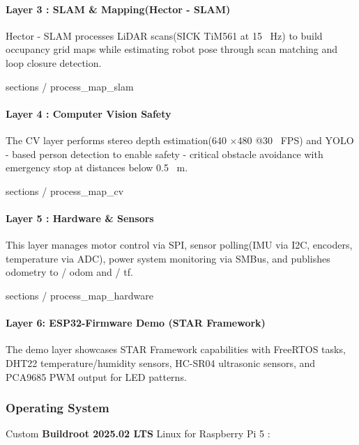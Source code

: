 \paragraph{Layer 3 : SLAM \& Mapping(Hector - SLAM)}

    Hector -
    SLAM processes LiDAR
    scans(SICK TiM561 at 15 ~Hz) to build occupancy grid maps while estimating
    robot pose through scan matching and loop closure detection.

 {
  sections / process_map_slam
}

\paragraph{Layer 4 : Computer Vision Safety}

    The CV layer performs stereo depth
    estimation(640 $\times$480 @30 ~FPS) and
    YOLO - based person detection to enable safety -
        critical obstacle avoidance with emergency stop at distances below
        0.5 ~m.

 {
  sections / process_map_cv
}

\paragraph{Layer 5 : Hardware \& Sensors}

This layer manages motor control via SPI,
    sensor polling(IMU via I2C, encoders, temperature via ADC),
    power system monitoring via SMBus,
    and publishes odometry to / odom and /
        tf.

 {
  sections / process_map_hardware
}

\paragraph{Layer 6: ESP32-Firmware Demo (STAR Framework)}

The demo layer showcases STAR Framework capabilities with FreeRTOS tasks, DHT22 temperature/humidity sensors, HC-SR04 ultrasonic sensors, and PCA9685 PWM output for LED patterns.



\subsubsection{Operating System}

Custom \textbf{Buildroot 2025.02 LTS} Linux for Raspberry Pi 5 \parencite{buildroot}:

